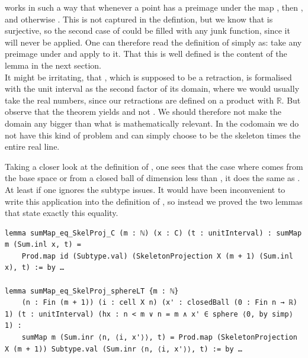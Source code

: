 \documentclass[11pt, a4paper, english]{article}
\theoremstyle{plain}
\theoremstyle{definition}
\theoremstyle{remark}
\numberwithin{equation}{section}
\numberwithin{theorem}{section}
\begin{document}
 works in such a way that whenever a point  has a preimage  under the map , then , and otherwise . This is not captured in the defintion, but we know that  is surjective, so the second case of  could be filled with any junk function, since it will never be applied. One can therefore read the definition of  simply as: take any preimage under  and apply  to it. That this is well defined is the content of the lemma  in the next section. \\

It might be irritating, that , which is supposed to be a retraction, is formalised with the unit interval as the second factor of its domain, where we would usually take the real numbers, since our retractions are defined on a product with $\mathbb{R}$. But observe that the theorem  yields  and not . We should therefore not make the domain any bigger than what is mathematically relevant. In the codomain we do not have this kind of problem and can simply choose  to be the skeleton times the entire real line.

Taking a closer look at the definition of , one sees that the case where  comes from the base space or from a closed ball of dimension less than , it does the same as . At least if one ignores the subtype issues. It would have been inconvenient to write this application into the definition of , so instead we proved the two lemmas that state exactly this equality.

\begin{verbatim}
lemma sumMap_eq_SkelProj_C (m : ℕ) (x : C) (t : unitInterval) : sumMap m (Sum.inl x, t) =
    Prod.map id (Subtype.val) (SkeletonProjection X (m + 1) (Sum.inl x), t) := by …

lemma sumMap_eq_SkelProj_sphereLT {m : ℕ}
    (n : Fin (m + 1)) (i : cell X n) (x' : closedBall (0 : Fin n → ℝ) 1) (t : unitInterval) (hx : n < m ∨ n = m ∧ x' ∈ sphere ⟨0, by simp⟩ 1) :
    sumMap m (Sum.inr ⟨n, ⟨i, x'⟩⟩, t) = Prod.map (SkeletonProjection X (m + 1)) Subtype.val (Sum.inr ⟨n, ⟨i, x'⟩⟩, t) := by …
\end{verbatim}
\end{document}
